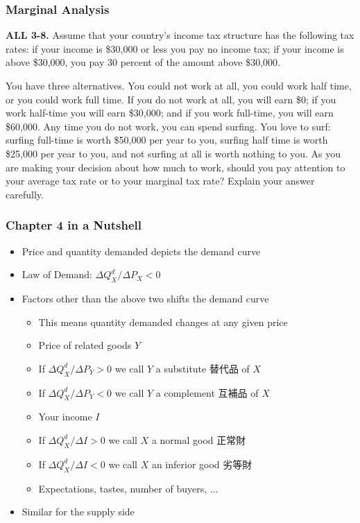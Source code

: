 \documentclass[12pt, xcolor=dvipsnames]{beamer}
\begin{document}
\begin{frame}
\frametitle{\bf Marginal Analysis}
\small \textsf{\bfseries ALL 3-8.} Assume that your country’s income tax structure has the following tax rates: if your income is \$30,000 or less you pay no income tax; if your income is above \$30,000, you pay 30 percent of the amount above \$30,000. 

You have three alternatives. You could not work at all, you could work half time, or you could work full time. If you do not work at all, you will earn \$0; if you work half-time you will earn \$30,000; and if you work full-time, you will earn \$60,000. Any time you do not work, you can spend surfing. You love to surf: surfing full-time is worth \$50,000 per year to you, surfing half time is worth \$25,000 per year to you, and not surfing at all is worth nothing to you. As you are making your decision about how much to work, should you pay attention to your average tax rate or to your marginal tax rate? Explain your answer carefully.
\end{frame}



\begin{frame}
\frametitle{\bf Chapter 4 in a Nutshell}
\begin{itemize}
\item Price and quantity demanded depicts the demand curve
\item Law of Demand: $\Delta Q_X^d/ \Delta P_X<0$
\item Factors other than the above two shifts the demand curve
\begin{itemize}
\item This means quantity demanded changes at any given price
\item Price of related goods $Y$
\item If $\Delta Q_X^d/ \Delta P_Y>0$ we call $Y$ a substitute 替代品 of $X$
\item If $\Delta Q_X^d/ \Delta P_Y<0$ we call $Y$ a complement 互補品 of $X$
\item Your income $I$
\item If $\Delta Q_X^d/ \Delta I>0$ we call $X$ a normal good 正常財
\item If $\Delta Q_X^d/ \Delta I<0$ we call $X$ an inferior good 劣等財
\item Expectations, tastes, number of buyers, ...
\end{itemize}
\item Similar for the supply side
\end{itemize}
\end{frame}
\end{document}
